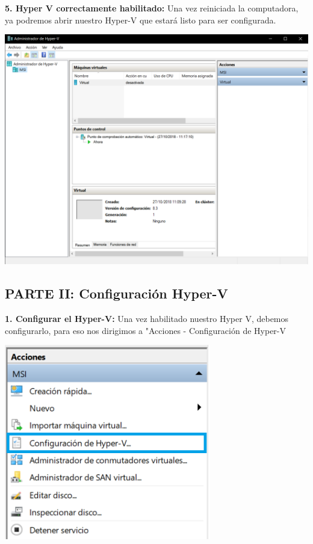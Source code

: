 \begin{enumerate}
\textbf {5. Hyper V correctamente habilitado:} Una vez reiniciada la computadora, ya podremos abrir nuestro Hyper-V que estará listo para ser configurada.\\
\begin{center}
  \includegraphics[width=14cm]{Imagenes/Hyper_V.png}
\end{center}
\break

\subsection{PARTE II: Configuración Hyper-V}

\textbf {1. Configurar el Hyper-V:} Una vez habilitado nuestro Hyper V, debemos configurarlo, para eso nos dirigimos a "Acciones - Configuración de Hyper-V
\begin{center}
  \includegraphics[width=9cm]{Imagenes/Acciones_Configuracion.png}
\end{center}
\vspace{12pt}\\


\end{enumerate}
